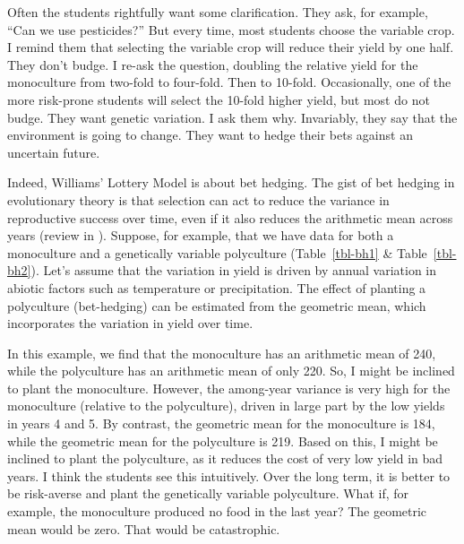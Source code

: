 \documentclass[
  american,
  letterpaper,
]{book}
\begin{document}
Often the students rightfully want some clarification. They ask, for
example, ``Can we use pesticides?'' But every time, most students choose
the variable crop. I remind them that selecting the variable crop will
reduce their yield by one half. They don't budge. I re-ask the question,
doubling the relative yield for the monoculture from two-fold to
four-fold. Then to 10-fold. Occasionally, one of the more risk-prone
students will select the 10-fold higher yield, but most do not budge.
They want genetic variation. I ask them why. Invariably, they say that
the environment is going to change. They want to hedge their bets
against an uncertain future.

Indeed, Williams' Lottery Model is about bet hedging. The gist of bet
hedging in evolutionary theory is that selection can act to reduce the
variance in reproductive success over time, even if it also reduces the
arithmetic mean across years (review in
). Suppose, for
example, that we have data for both a monoculture and a genetically
variable polyculture (Table~\ref{tbl-bh1} \& Table~\ref{tbl-bh2}). Let's
assume that the variation in yield is driven by annual variation in
abiotic factors such as temperature or precipitation. The effect of
planting a polyculture (bet-hedging) can be estimated from the geometric
mean, which incorporates the variation in yield over time.

In this example, we find that the monoculture has an arithmetic mean of
240, while the polyculture has an arithmetic mean of only 220. So, I
might be inclined to plant the monoculture. However, the among-year
variance is very high for the monoculture (relative to the polyculture),
driven in large part by the low yields in years 4 and 5. By contrast,
the geometric mean for the monoculture is 184, while the geometric mean
for the polyculture is 219. Based on this, I might be inclined to plant
the polyculture, as it reduces the cost of very low yield in bad years.
I think the students see this intuitively. Over the long term, it is
better to be risk-averse and plant the genetically variable polyculture.
What if, for example, the monoculture produced no food in the last year?
The geometric mean would be zero. That would be catastrophic.
\end{document}
